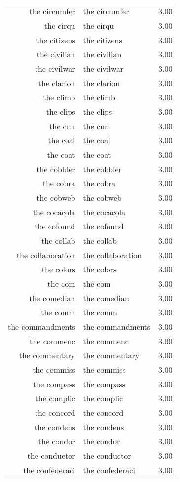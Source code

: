 \begin{table}[ht]
\begin{tabular}{rlr}
  the circumfer & the circumfer & 3.00 \\ 
  the cirqu & the cirqu & 3.00 \\ 
  the citizens & the citizens & 3.00 \\ 
  the civilian & the civilian & 3.00 \\ 
  the civilwar & the civilwar & 3.00 \\ 
  the clarion & the clarion & 3.00 \\ 
  the climb & the climb & 3.00 \\ 
  the clips & the clips & 3.00 \\ 
  the cnn & the cnn & 3.00 \\ 
  the coal & the coal & 3.00 \\ 
  the coat & the coat & 3.00 \\ 
  the cobbler & the cobbler & 3.00 \\ 
  the cobra & the cobra & 3.00 \\ 
  the cobweb & the cobweb & 3.00 \\ 
  the cocacola & the cocacola & 3.00 \\ 
  the cofound & the cofound & 3.00 \\ 
  the collab & the collab & 3.00 \\ 
  the collaboration & the collaboration & 3.00 \\ 
  the colors & the colors & 3.00 \\ 
  the com & the com & 3.00 \\ 
  the comedian & the comedian & 3.00 \\ 
  the comm & the comm & 3.00 \\ 
  the commandments & the commandments & 3.00 \\ 
  the commenc & the commenc & 3.00 \\ 
  the commentary & the commentary & 3.00 \\ 
  the commiss & the commiss & 3.00 \\ 
  the compass & the compass & 3.00 \\ 
  the complic & the complic & 3.00 \\ 
  the concord & the concord & 3.00 \\ 
  the condens & the condens & 3.00 \\ 
  the condor & the condor & 3.00 \\ 
  the conductor & the conductor & 3.00 \\ 
  the confederaci & the confederaci & 3.00 \\ 

\end{tabular}
\end{table}
